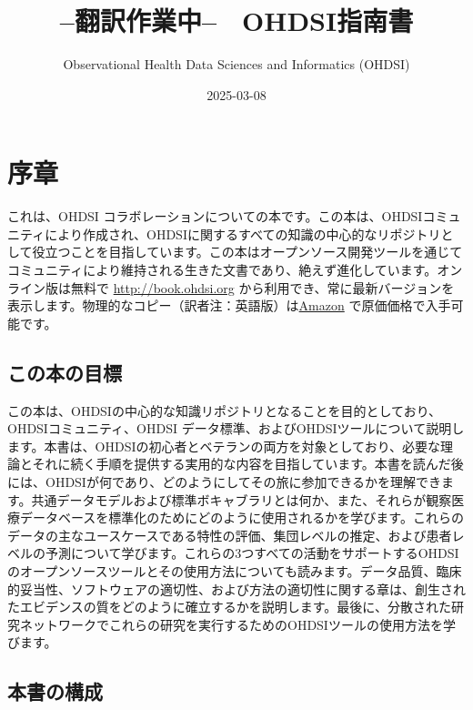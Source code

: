 \documentclass[
  11pt]{book}
\title{--翻訳作業中--　OHDSI指南書}
\author{Observational Health Data Sciences and Informatics (OHDSI)}
\date{2025-03-08}
\theoremstyle{definition}
\theoremstyle{definition}
\theoremstyle{definition}
\theoremstyle{definition}
\theoremstyle{remark}
\begin{document}
\maketitle

{
\setcounter{tocdepth}{1}
\tableofcontents
}
\chapter*{序章}\label{ux5e8fux7ae0}

これは、OHDSI コラボレーションについての本です。この本は、OHDSIコミュニティにより作成され、OHDSIに関するすべての知識の中心的なリポジトリとして役立つことを目指しています。この本はオープンソース開発ツールを通じてコミュニティにより維持される生きた文書であり、絶えず進化しています。オンライン版は無料で \url{http://book.ohdsi.org} から利用でき、常に最新バージョンを表示します。物理的なコピー（訳者注：英語版）は\href{https://www.amazon.com/OHDSI-Observational-Health-Sciences-Informatics/dp/1088855199}{Amazon} で原価価格で入手可能です。

\section*{この本の目標}\label{ux3053ux306eux672cux306eux76eeux6a19}

この本は、OHDSIの中心的な知識リポジトリとなることを目的としており、OHDSIコミュニティ、OHDSI データ標準、およびOHDSIツールについて説明します。本書は、OHDSIの初心者とベテランの両方を対象としており、必要な理論とそれに続く手順を提供する実用的な内容を目指しています。本書を読んだ後には、OHDSIが何であり、どのようにしてその旅に参加できるかを理解できます。共通データモデルおよび標準ボキャブラリとは何か、また、それらが観察医療データベースを標準化のためにどのように使用されるかを学びます。これらのデータの主なユースケースである特性の評価、集団レベルの推定、および患者レベルの予測について学びます。これらの3つすべての活動をサポートするOHDSIのオープンソースツールとその使用方法についても読みます。データ品質、臨床的妥当性、ソフトウェアの適切性、および方法の適切性に関する章は、創生されたエビデンスの質をどのように確立するかを説明します。最後に、分散された研究ネットワークでこれらの研究を実行するためのOHDSIツールの使用方法を学びます。

\section*{本書の構成}\label{ux672cux66f8ux306eux69cbux6210}
\end{document}
